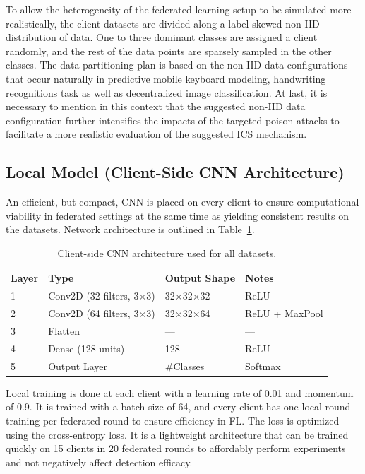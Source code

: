 \documentclass[conference]{IEEEtran}
\begin{document}
To allow the heterogeneity of the federated learning setup to be simulated more realistically, the client datasets are divided along a label-skewed non-IID distribution of data. One to three dominant classes are assigned a client randomly, and the rest of the data points are sparsely sampled in the other classes. The data partitioning plan is based on the non-IID data configurations that occur naturally in predictive mobile keyboard modeling, handwriting recognitions task as well as decentralized image classification. At last, it is necessary to mention in this context that the suggested non-IID data configuration further intensifies the impacts of the targeted poison attacks to facilitate a more realistic evaluation of the suggested ICS mechanism.

\subsection{Local Model (Client-Side CNN Architecture)}
\label{sec:localmodel}

An efficient, but compact, CNN is placed on every client to ensure computational viability in federated settings at the same time as yielding consistent results on the datasets. Network architecture is outlined in Table~\ref{tab:cnn}.

\begin{table}[t]
\centering
\caption{Client-side CNN architecture used for all datasets.}
\label{tab:cnn}
\begin{tabular}{p{0.6cm} p{2.8cm} p{2.0cm} p{1.8cm}}
\toprule
\textbf{Layer} & \textbf{Type} & \textbf{Output Shape} & \textbf{Notes} \\
\midrule

1 & Conv2D (32 filters, 3$\times$3) & 32$\times$32$\times$32 & ReLU \\[4pt]

2 & Conv2D (64 filters, 3$\times$3) & 32$\times$32$\times$64 & ReLU + MaxPool \\[4pt]

3 & Flatten & --- & --- \\[4pt]

4 & Dense (128 units) & 128 & ReLU \\[4pt]

5 & Output Layer & \#Classes & Softmax \\
\bottomrule
\end{tabular}
\end{table}

Local training is done at each client with a learning rate of 0.01 and momentum of 0.9. It is trained with a batch size of 64, and every client has one local round training per federated round to ensure efficiency in FL. The loss is optimized using the cross-entropy loss. It is a lightweight architecture that can be trained quickly on 15 clients in 20 federated rounds to affordably perform experiments and not negatively affect detection efficacy.
\end{document}
